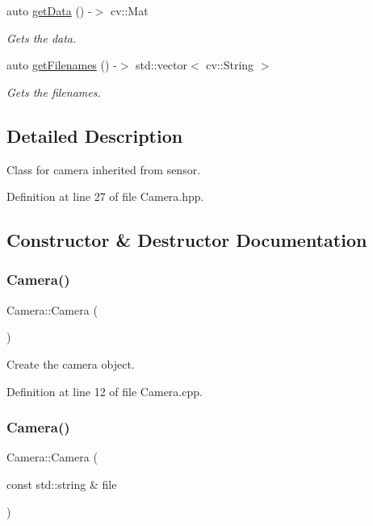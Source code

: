 \begin{DoxyCompactItemize}
auto \hyperlink{class_camera_acd484ba9de5bb9f6a86bf40396dc4e69}{get\+Data} () -\/$>$ cv\+::\+Mat
\begin{DoxyCompactList}\small\item\em Gets the data. \end{DoxyCompactList}\item 
auto \hyperlink{class_camera_a6d379d7a64c1469edad924b925cdcb1d}{get\+Filenames} () -\/$>$ std\+::vector$<$ cv\+::\+String $>$
\begin{DoxyCompactList}\small\item\em Gets the filenames. \end{DoxyCompactList}\end{DoxyCompactItemize}


\subsection{Detailed Description}
Class for camera inherited from sensor. 

Definition at line 27 of file Camera.\+hpp.



\subsection{Constructor \& Destructor Documentation}
\mbox{\label{class_camera_a01f94c3543f56ede7af49dc778f19331}} 
\subsubsection{\texorpdfstring{Camera()}{Camera()}\hspace{0.1cm}{\footnotesize\ttfamily [1/3]}}
{\footnotesize\ttfamily Camera\+::\+Camera (\begin{DoxyParamCaption}{ }\end{DoxyParamCaption})}



Create the camera object. 



Definition at line 12 of file Camera.\+cpp.

\mbox{\label{class_camera_ae105913661d2f33f91bdfb5a6ab1db8b}} 
\subsubsection{\texorpdfstring{Camera()}{Camera()}\hspace{0.1cm}{\footnotesize\ttfamily [2/3]}}
{\footnotesize\ttfamily Camera\+::\+Camera (\begin{DoxyParamCaption}\item[{const std\+::string \&}]{file }\end{DoxyParamCaption})\hspace{0.3cm}{\ttfamily [explicit]}}



